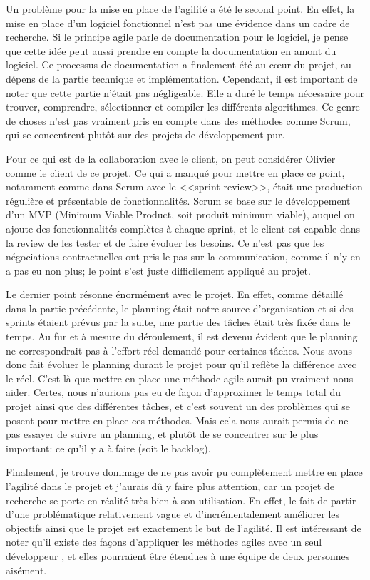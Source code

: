 \documentclass[openany, 11pt]{memoir}
\begin{document}
Un problème pour la mise en place de l'agilité a été le second point. En effet, la mise en place d'un logiciel fonctionnel n'est pas une évidence dans un cadre de recherche. Si le principe agile parle de documentation pour le logiciel, je pense que cette idée peut aussi prendre en compte la documentation en amont du logiciel. Ce processus de documentation a finalement été au cœur du projet, au dépens de la partie technique et implémentation. Cependant, il est important de noter que cette partie n'était pas négligeable. Elle a duré le temps nécessaire pour trouver, comprendre, sélectionner et compiler les différents algorithmes. Ce genre de choses n'est pas vraiment pris en compte dans des méthodes comme Scrum, qui se concentrent plutôt sur des projets de développement pur.

Pour ce qui est de la collaboration avec le client, on peut considérer Olivier comme le client de ce projet. Ce qui a manqué pour mettre en place ce point, notamment comme dans Scrum avec le <<sprint review>>, était une production régulière et présentable de fonctionnalités. Scrum se base sur le développement d'un MVP (Minimum Viable Product, soit produit minimum viable), auquel on ajoute des fonctionnalités complètes à chaque sprint, et le client est capable dans la review de les tester et de faire évoluer les besoins. Ce n'est pas que les négociations contractuelles ont pris le pas sur la communication, comme il n'y en a pas eu non plus; le point s'est juste difficilement appliqué au projet.

Le dernier point résonne énormément avec le projet. En effet, comme détaillé dans la partie précédente, le planning était notre source d'organisation et si des sprints étaient prévus par la suite, une partie des tâches était très fixée dans le temps. Au fur et à mesure du déroulement, il est devenu évident que le planning ne correspondrait pas à l'effort réel demandé pour certaines tâches. Nous avons donc fait évoluer le planning durant le projet pour qu'il reflète la différence avec le réel. C'est là que mettre en place une méthode agile aurait pu vraiment nous aider. Certes, nous n'aurions pas eu de façon d'approximer le temps total du projet ainsi que des différentes tâches, et c'est souvent un des problèmes qui se posent pour mettre en place ces méthodes. Mais cela nous aurait permis de ne pas essayer de suivre un planning, et plutôt de se concentrer sur le plus important: ce qu'il y a à faire (soit le backlog).

\bigskip
Finalement, je trouve dommage de ne pas avoir pu complètement mettre en place l'agilité dans le projet et j'aurais dû y faire plus attention, car un projet de recherche se porte en réalité très bien à son utilisation. En effet, le fait de partir d'une problématique relativement vague et d'incrémentalement améliorer les objectifs ainsi que le projet est exactement le but de l'agilité. Il est intéressant de noter qu'il existe des façons d'appliquer les méthodes agiles avec un seul développeur \cite{agilesolo} \cite{ssdm}, et elles pourraient être étendues à une équipe de deux personnes aisément.
\end{document}
